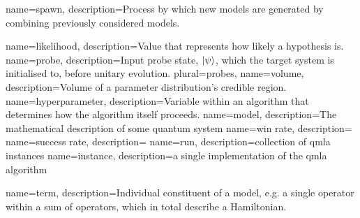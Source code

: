 


{
    name=spawn,
    description={Process by which new models are generated by combining previously considered models.}
}

{
    name=likelihood,
    description={Value that represents how likely a hypothesis is.}
}
{
    name=probe,
    description={Input probe state, $\ket{\psi}$, which the target system is initialised to, before unitary evolution.}
    plural={probes},
}
{
    name=volume,
    description={Volume of a parameter distribution's credible region.}
}
{
    name=hyperparameter,
    description={Variable within an algorithm that determines how the algorithm itself proceeds.}
}
{
    name=model,
    description={The mathematical description of some quantum system}
}
{
    name=win rate,
    description={}
}
{
    name=success rate,
    description={}
}
{
    name=run,
    description={collection of \gls{qmla} instances}
}
{
    name=instance,
    description={a single implementation of the \gls{qmla} algorithm}
}

{
    name=term,
    description={Individual constituent of a model, 
    e.g. a single operator within a sum of operators, which in total describe a Hamiltonian.
    }
}

\makeglossaries
